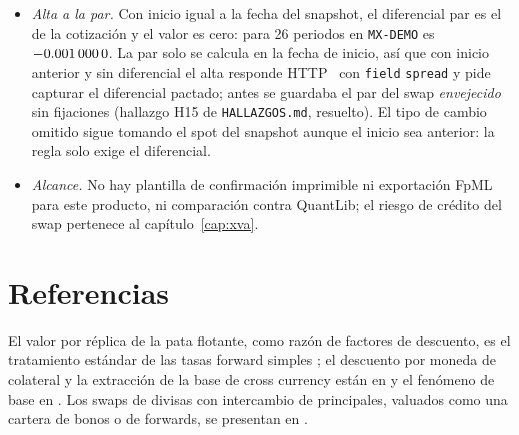 \begin{limites}
\begin{itemize}
          pago (Metodología, «Calendarios»). Al dar de alta, el plazo se redondea a periodos enteros de $28$ días.
    \item \emph{Alta a la par.} Con inicio igual a la fecha del snapshot, el diferencial par es el de la cotización
          y el valor es cero: para 26 periodos en \texttt{MX-DEMO} es
          $\verif{cap07-alta-par-spread}{-0.0010000}$. La par solo se calcula en la fecha de inicio, así que con
          inicio anterior y sin diferencial el alta responde HTTP~ con
          \texttt{field} \texttt{spread} y pide capturar el diferencial pactado; antes se guardaba el par del swap
          \emph{envejecido} sin fijaciones (hallazgo H15 de \texttt{HALLAZGOS.md}, resuelto). El tipo de cambio
          omitido sigue tomando el spot del snapshot aunque el inicio sea anterior: la regla solo exige el
          diferencial.
    \item \emph{Alcance.} No hay plantilla de confirmación imprimible ni exportación FpML para este producto, ni
          comparación contra QuantLib; el riesgo de crédito del swap pertenece al capítulo~\ref{cap:xva}.
  \end{itemize}
\end{limites}

\section{Referencias}\label{sec:cap07-referencias}

El valor por réplica de la pata flotante, como razón de factores de descuento, es el tratamiento estándar de las
tasas forward simples \citep{andersen2010,hull2018}; el descuento por moneda de colateral y la extracción de la
base de cross currency están en \citet{fujii2009} y el fenómeno de base en \citet{du2018}. Los swaps
de divisas con intercambio de principales, valuados como una cartera de bonos o de forwards, se presentan en
\citet{hull2018}.
